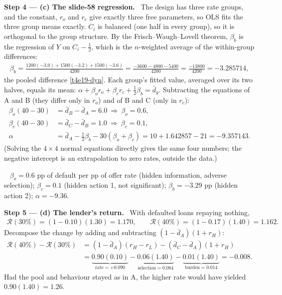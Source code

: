 \documentclass[11pt,a4paper]{article}
\newcommand{\step}[2]{\par\medskip\noindent\textbf{Step #1 --- #2.}~}
\newcommand{\answer}[1]{\par\smallskip\noindent\fbox{\textbf{Answer #1.}}~}
\begin{document}
\step{4}{(c) The slide-58 regression} The design has three rate groups, and the constant, $r_o$ and $r_c$ give
exactly three free parameters, so OLS fits the three group means exactly. $C_i$ is balanced (one half in every
group), so it is orthogonal to the group structure. By the Frisch--Waugh--Lovell theorem, $\beta_b$ is the
regression of $Y$ on $C_i-\tfrac12$, which is the $n$-weighted average of the within-group differences:
\begin{align}
  \beta_b = \frac{1200(-3.0)+1500(-3.2)+1500(-3.6)}{4200} = \frac{-3600-4800-5400}{4200} = \frac{-13800}{4200} = -3.285714, \nonumber
\end{align}
the pooled difference \eqref{t4e19-dyn}. Each group's fitted value, averaged over its two halves, equals its mean:
$\alpha+\beta_o r_o+\beta_c r_c+\tfrac12\beta_b=\bar d_g$. Subtracting the equations of A and B (they differ only
in $r_o$) and of B and C (only in $r_c$):
\begin{align}
  \beta_o(40-30) &= \bar d_B-\bar d_A = 6.0 \ \Longrightarrow\ \beta_o = 0.6, \nonumber\\
  \beta_c(40-30) &= \bar d_C-\bar d_B = 1.0 \ \Longrightarrow\ \beta_c = 0.1, \nonumber\\
  \alpha &= \bar d_A-\tfrac12\beta_b-30(\beta_o+\beta_c) = 10+1.642857-21 = -9.357143. \nonumber
\end{align}
(Solving the $4\times4$ normal equations directly gives the same four numbers; the negative intercept is an
extrapolation to zero rates, outside the data.)

\answer{(c)} $\beta_o=0.6$ pp of default per pp of offer rate (hidden information, adverse selection);
$\beta_c=0.1$ (hidden action 1, not significant); $\beta_b=-3.29$ pp (hidden action 2); $\alpha=-9.36$.

\step{5}{(d) The lender's return} With defaulted loans repaying nothing,
\begin{align}
  \mathcal R(30\%) = (1-0.10)(1.30) = 1.170,\qquad \mathcal R(40\%) = (1-0.17)(1.40) = 1.162. \label{t4e19-R}
\end{align}
Decompose the change by adding and subtracting $(1-\bar d_A)(1+r_H)$:
\begin{align}
  \mathcal R(40\%)-\mathcal R(30\%) &= (1-\bar d_A)(r_H-r_L) - (\bar d_C-\bar d_A)(1+r_H) \nonumber\\
  &= \underbrace{0.90(0.10)}_{\text{rate}=+0.090} - \underbrace{0.06(1.40)}_{\text{selection}=0.084} - \underbrace{0.01(1.40)}_{\text{burden}=0.014} = -0.008. \nonumber
\end{align}
Had the pool and behaviour stayed as in A, the higher rate would have yielded $0.90(1.40)=1.26$.
\end{document}
